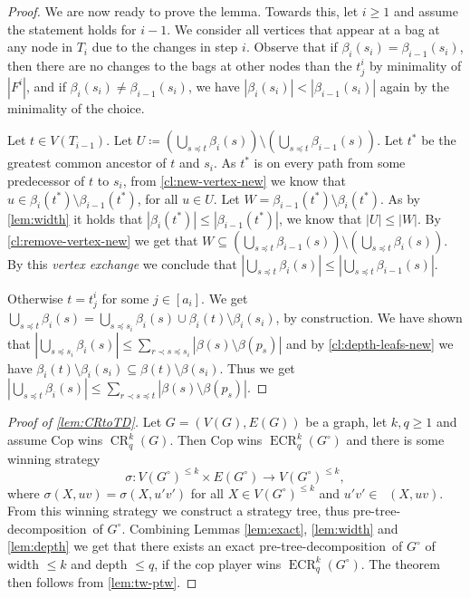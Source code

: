 \documentclass{lmcs}
\theoremstyle{plain}\newtheorem{claim}[thm]{Claim}   %
\DeclareMathOperator{\CR}{CR}
\newcommand{\CRkq}{\CR^k_q}
\DeclareMathOperator{\eCR}{ECR}
\newcommand{\eCRkq}{\eCR^k_q}
\DeclareMathOperator{\escapeE}{comp_E}
\newcommand{\preTreeDec}{pre-tree-decomposition}
\begin{document}
\begin{proof}
	We are now ready to prove the lemma.
	Towards this, let $i\geq 1$ and assume the statement holds for $i-1$.
	We consider all vertices that appear at a bag at any node in $T_i$ due to the changes in step $i$.
	Observe that if $\beta_i(s_i)=\beta_{i-1}(s_i)$, then there are no changes to the bags at other nodes than the $t^i_j$ by minimality of $|F^i|$, and if $\beta_i(s_i)\neq\beta_{i-1}(s_i)$,  we have $|\beta_i(s_i)|<|\beta_{i-1}(s_i)|$ again by the minimality of the choice.
	
	Let $t\in V(T_{i-1})$.
	Let $U \coloneqq \left(\bigcup_{s \preceq t} \beta_{i}(s)\right) \setminus \left(\bigcup_{s \preceq t} \beta_{i-1}(s)\right)$.
	Let $t^*$ be the greatest common ancestor of $t$ and $s_i$.
	As $t^*$ is on every path from some predecessor of $t$ to $s_i$, from \autoref{cl:new-vertex-new} we know that $u\in\beta_i(t^*)\setminus \beta_{i-1}(t^*)$, for all $u\in U$.
	Let $W = \beta_{i-1}(t^*)\setminus \beta_{i}(t^*)$.
	As by \autoref{lem:width} it holds that $|\beta_i(t^*)|\leq |\beta_{i-1}(t^*)|$, we know that $|U| \leq |W|$.
	By \autoref{cl:remove-vertex-new} we get that $W\subseteq \left(\bigcup_{s \preceq t} \beta_{i-1}(s)\right) \setminus \left(\bigcup_{s \preceq t} \beta_{i}(s)\right)$.
	By this \emph{vertex exchange} we conclude that $\left|\bigcup_{s \preceq t} \beta_{i}(s)\right| \leq \left|\bigcup_{s \preceq t} \beta_{i-1}(s)\right|$.
	
	Otherwise $t=t^i_j$ for some $j\in [a_i]$.
	We get $\bigcup_{s\preceq{t}} \beta_{i}(s) = \bigcup_{s\preceq{s_i}} \beta_{i}(s) \cup \beta_i(t) \setminus \beta_i(s_i)$, by construction.
	We have shown that $|\bigcup_{s\preceq{s_i}} \beta_{i}(s)| \leq \sum_{r\prec s\preceq{s_i}} |\beta(s) \setminus \beta(p_s)|$ 
	and by \autoref{cl:depth-leafs-new} we have $\beta_i(t) \setminus \beta_i(s_i) \subseteq \beta(t)\setminus \beta(s_i)$.
	Thus we get $|\bigcup_{s\preceq{t}} \beta_i(s)| \leq \sum_{r\prec s\preceq{t}} |\beta(s) \setminus \beta(p_s)|$.	
\end{proof}

\begin{proof}[Proof of \autoref{lem:CRtoTD}]
	Let $G=(V(G),E(G))$ be a graph, let $k,q\geq 1$ and assume Cop wins $\CRkq(G)$.
	Then Cop wins $\eCRkq(G^\circ)$ and there is some winning strategy \[\sigma\colon V(G^\circ)^{\leq k}\times E(G^\circ)\rightarrow V(G^\circ)^{\leq k},\]
	where $\sigma(X,uv)=\sigma(X,u'v')$ for all $X\in V(G^\circ)^{\leq k}$ and $u'v'\in\escapeE(X,uv)$.
	From this winning strategy we construct a strategy tree, thus \preTreeDec\ of $G^\circ$.
	Combining Lemmas \ref{lem:exact}, \ref{lem:width} and \ref{lem:depth} we get that there exists an exact \preTreeDec\ of $G^\circ$ of width $\leq k$ and depth $\leq q$, if the cop player wins $\eCRkq(G^\circ)$.
	The theorem then follows from \autoref{lem:tw-ptw}.
\end{proof}
\end{document}

